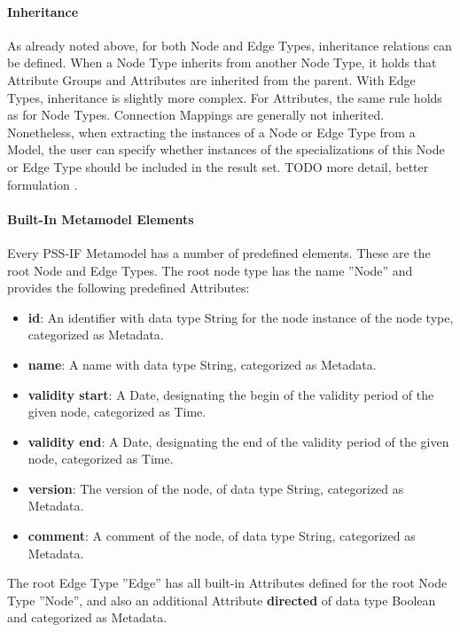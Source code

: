 \paragraph{Inheritance}

As already noted above, for both Node and Edge Types, inheritance relations can be defined. When a Node Type inherits from another Node Type, it holds that Attribute Groups and Attributes are inherited from the parent. With Edge Types, inheritance is slightly more complex. For Attributes, the same rule holds as for Node Types. Connection Mappings are generally not inherited. Nonetheless, when extracting the instances of a Node or Edge Type from a Model, the user can specify whether instances of the specializations of this Node or Edge Type should be included in the result set. \color{red}TODO more detail, better formulation \color{black}.

\paragraph{Built-In Metamodel Elements}

Every PSS-IF Metamodel has a number of predefined elements. These are the root Node and Edge Types. The root node type has the name ''Node'' and provides the following predefined Attributes:

\begin{itemize}
\item \textbf{id}: An identifier with data type String for the node instance of the node type, categorized as Metadata.
\item \textbf{name}: A name with data type String, categorized as Metadata.
\item \textbf{validity start}: A Date, designating the begin of the validity period of the given node, categorized as Time.
\item \textbf{validity end}: A Date, designating the end of the validity period of the given node, categorized as Time.
\item \textbf{version}: The version of the node, of data type String, categorized as Metadata.
\item \textbf{comment}: A comment of the node, of data type String, categorized as Metadata.
\end{itemize}

The root Edge Type ''Edge'' has all built-in Attributes defined for the root Node Type ''Node'', and also an additional Attribute \textbf{directed} of data type Boolean and categorized as Metadata. 

